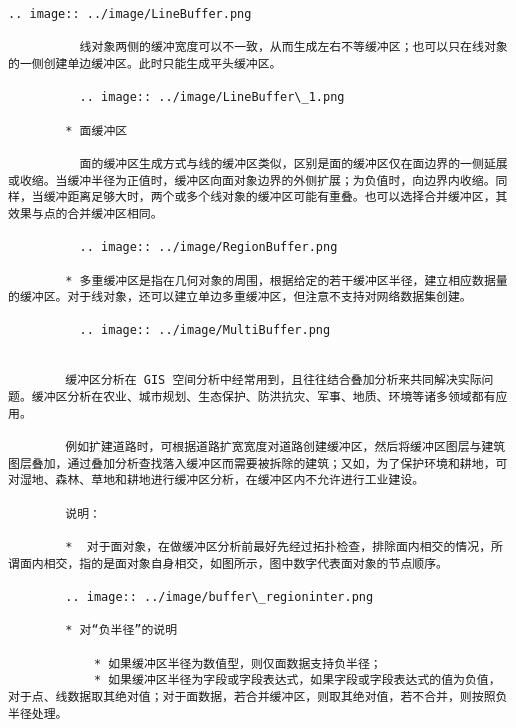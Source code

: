 \documentclass[11pt]{article}
\begin{document}
\begin{Verbatim}[commandchars=\\\{\}]
          .. image:: ../image/LineBuffer.png
        
          线对象两侧的缓冲宽度可以不一致，从而生成左右不等缓冲区；也可以只在线对象的一侧创建单边缓冲区。此时只能生成平头缓冲区。
        
          .. image:: ../image/LineBuffer\_1.png
        
        * 面缓冲区
        
          面的缓冲区生成方式与线的缓冲区类似，区别是面的缓冲区仅在面边界的一侧延展或收缩。当缓冲半径为正值时，缓冲区向面对象边界的外侧扩展；为负值时，向边界内收缩。同样，当缓冲距离足够大时，两个或多个线对象的缓冲区可能有重叠。也可以选择合并缓冲区，其效果与点的合并缓冲区相同。
        
          .. image:: ../image/RegionBuffer.png
        
        * 多重缓冲区是指在几何对象的周围，根据给定的若干缓冲区半径，建立相应数据量的缓冲区。对于线对象，还可以建立单边多重缓冲区，但注意不支持对网络数据集创建。
        
          .. image:: ../image/MultiBuffer.png
        
        
        缓冲区分析在 GIS 空间分析中经常用到，且往往结合叠加分析来共同解决实际问题。缓冲区分析在农业、城市规划、生态保护、防洪抗灾、军事、地质、环境等诸多领域都有应用。
        
        例如扩建道路时，可根据道路扩宽宽度对道路创建缓冲区，然后将缓冲区图层与建筑图层叠加，通过叠加分析查找落入缓冲区而需要被拆除的建筑；又如，为了保护环境和耕地，可对湿地、森林、草地和耕地进行缓冲区分析，在缓冲区内不允许进行工业建设。
        
        说明：
        
        *  对于面对象，在做缓冲区分析前最好先经过拓扑检查，排除面内相交的情况，所谓面内相交，指的是面对象自身相交，如图所示，图中数字代表面对象的节点顺序。
        
        .. image:: ../image/buffer\_regioninter.png
        
        * 对“负半径”的说明
        
            * 如果缓冲区半径为数值型，则仅面数据支持负半径；
            * 如果缓冲区半径为字段或字段表达式，如果字段或字段表达式的值为负值，对于点、线数据取其绝对值；对于面数据，若合并缓冲区，则取其绝对值，若不合并，则按照负半径处理。
        

\end{Verbatim}
\end{document}
